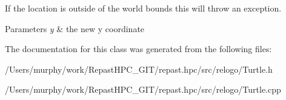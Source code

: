 If the location is outside of the world bounds this will throw an exception.


\begin{DoxyParams}{Parameters}
{\em y} & the new y coordinate \\
\hline
\end{DoxyParams}


The documentation for this class was generated from the following files\-:\begin{DoxyCompactItemize}
\item 
/\-Users/murphy/work/\-Repast\-H\-P\-C\-\_\-\-G\-I\-T/repast.\-hpc/src/relogo/Turtle.\-h\item 
/\-Users/murphy/work/\-Repast\-H\-P\-C\-\_\-\-G\-I\-T/repast.\-hpc/src/relogo/Turtle.\-cpp\end{DoxyCompactItemize}
